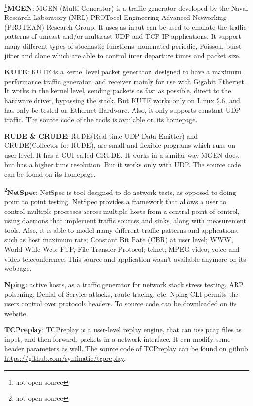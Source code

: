 \footnote{not open-source}\textbf{MGEN}\cite{web-mgen}: MGEN (Multi-Generator) is a traffic generator developed by the Naval Research Laboratory (NRL) PROTocol Engineering Advanced Networking (PROTEAN) Research Group. It uses as input can be used to emulate the traffic patterns of unicast and/or multicast UDP and TCP IP applications. It support many different types of stochastic functions, nominated periodic, Poisson, burst jitter and clone which are able to control inter departure times and packet size.


\textbf{KUTE}\cite{web-kute}: KUTE is a kernel level packet generator, designed to have a maximum performance traffic generator, and receiver mainly for use with Gigabit Ethernet. It works in the kernel level, sending packets as fast as possible, direct to the hardware driver, bypassing the stack. But KUTE works only on Linux 2.6, and has only be tested on Ethernet Hardware. Also, it only supports constant UDP traffic. The source code of the tools is available on its homepage.


\textbf{RUDE \& CRUDE}\cite{web-rude-crude}: RUDE(Real-time UDP Data Emitter) and CRUDE(Collector for RUDE), are small and flexible programs which runs on user-level. It has a GUI called GRUDE. It works in a similar way MGEN does, but has a higher time resolution. But it works only with UDP. The source code can be found on its homepage.


\footnote{not open-source}\textbf{NetSpec}\cite{web-netspec}: NetSpec is tool designed to do network tests, as opposed to doing point to point testing. NetSpec provides a framework that allows a user to control multiple processes across multiple hosts from a central point of control, using daemons that implement traffic sources and sinks, along with measurement tools. Also, it is able to model many different traffic patterns and applications, such as host maximum rate; Constant Bit Rate (CBR) at user level; WWW, World Wide Web; FTP, File Transfer Protocol; telnet; MPEG video; voice and video teleconference. This source and application wasn't available anymore on its webpage.


\textbf{Nping}\cite{web-nping}: active hosts, as a traffic generator for network stack stress testing, ARP poisoning, Denial of Service attacks, route tracing, etc. Nping CLI permits the users control over protocols headers. To source code can be downloaded on its website.


\textbf{TCPreplay}\cite{web-tcpreplay}: TCPreplay is a user-level replay engine, that can use pcap files as input, and then forward, packets in a network interface. It can modify some header parameters as well. The source code of TCPreplay can be found on github \href{https://github.com/synfinatic/tcpreplay}{https://github.com/synfinatic/tcpreplay}.


